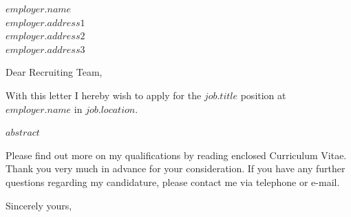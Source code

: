 \documentclass[10pt,a4paper]{letter}
\begin{document}
 
\begin{letter}{$employer.name$ \\ $employer.address1$ \\ $employer.address2$ \\ $employer.address3$} 
\opening{Dear Recruiting Team,} 
With this letter I hereby wish to apply for the \textbf{$job.title$} position at $employer.name$ in $job.location$.

$abstract$


Please find out more on my qualifications by reading enclosed Curriculum Vitae. Thank you very much in advance for your consideration. If you have any further questions regarding my candidature, please contact me via telephone or e-mail.


\closing{Sincerely yours,\\
 \\
}
 
\end{letter} 
\end{document}
